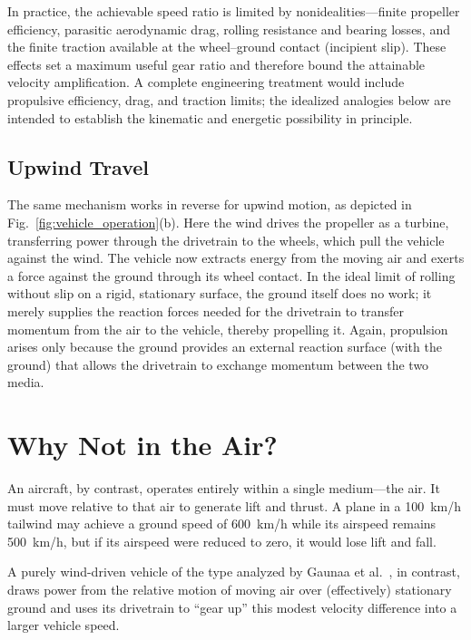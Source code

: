 \documentclass[reprint,aps,pra,longbibliography]{revtex4-2}
\begin{document}
In practice, the achievable speed ratio is limited by nonidealities---finite propeller efficiency, parasitic aerodynamic drag, rolling resistance and bearing losses, and the finite traction available at the wheel--ground contact (incipient slip). These effects set a maximum useful gear ratio and therefore bound the attainable velocity amplification. A complete engineering treatment would include propulsive efficiency, drag, and traction limits; the idealized analogies below are intended to establish the kinematic and energetic possibility in principle.

\subsection{Upwind Travel}

The same mechanism works in reverse for upwind motion, as depicted in Fig.~\ref{fig:vehicle_operation}(b). Here the wind drives the propeller as a turbine, transferring power through the drivetrain to the wheels, which pull the vehicle against the wind.
The vehicle now extracts energy from the moving air and exerts a force against the ground through its wheel contact. In the ideal limit of rolling without slip on a rigid, stationary surface, the ground itself does no work; it merely supplies the reaction forces needed for the drivetrain to transfer momentum from the air to the vehicle, thereby propelling it.
Again, propulsion arises only because the ground provides an external reaction surface (with the ground) that allows the drivetrain to exchange momentum between the two media.


\section{Why Not in the Air?}
\label{wind:whynotintheair}

An aircraft, by contrast, operates entirely within a single medium---the air. It must move relative to that air to generate lift and thrust.
A plane in a \SI{100}{km/h} tailwind may achieve a ground speed of \SI{600}{km/h} while its airspeed remains \SI{500}{km/h}, but if its airspeed were reduced to zero, it would lose lift and fall.

A purely wind-driven vehicle of the type analyzed by Gaunaa et al.~\cite{Gaunaa2009}, in contrast, draws power from the relative motion of moving air over (effectively) stationary ground and uses its drivetrain to ``gear up'' this modest velocity difference into a larger vehicle speed.
\end{document}
